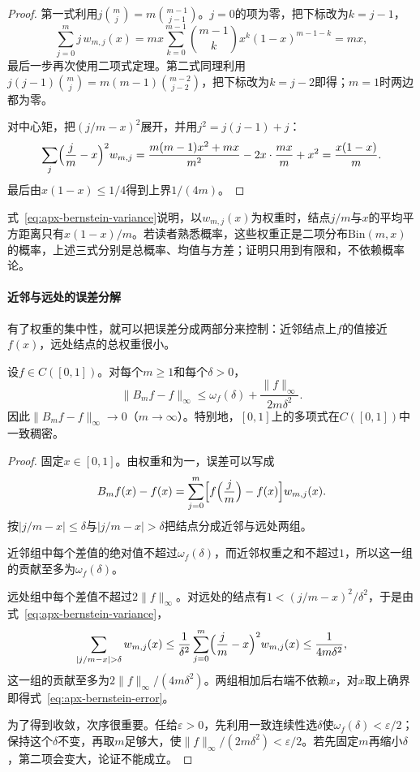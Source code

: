 \begin{proof}
第一式利用$j\binom mj=m\binom{m-1}{j-1}$。$j=0$的项为零，把下标改为$k=j-1$，
\[
  \sum_{j=0}^m j\,w_{m,j}(x)
  =mx\sum_{k=0}^{m-1}\binom{m-1}{k}x^k(1-x)^{m-1-k}=mx,
\]
最后一步再次使用二项式定理。第二式同理利用$j(j-1)\binom mj=m(m-1)\binom{m-2}{j-2}$，把下标改为$k=j-2$即得；$m=1$时两边都为零。

对中心矩，把$(j/m-x)^2$展开，并用$j^2=j(j-1)+j$：
\[
  \sum_{j}\Bigl(\frac jm-x\Bigr)^2w_{m,j}
  =\frac{m(m-1)x^2+mx}{m^2}-2x\cdot\frac{mx}{m}+x^2
  =\frac{x(1-x)}m .
\]
最后由$x(1-x)\le1/4$得到上界$1/(4m)$。
\end{proof}

式~\eqref{eq:apx-bernstein-variance}说明，以$w_{m,j}(x)$为权重时，结点$j/m$与$x$的平均平方距离只有$x(1-x)/m$。若读者熟悉概率，这些权重正是二项分布$\mathrm{Bin}(m,x)$的概率，上述三式分别是总概率、均值与方差；证明只用到有限和，不依赖概率论。

\paragraph{近邻与远处的误差分解}

有了权重的集中性，就可以把误差分成两部分来控制：近邻结点上$f$的值接近$f(x)$，远处结点的总权重很小。

\begin{theorem}
\label{thm:apx-bernstein}
设$f\in C([0,1])$。对每个$m\ge1$和每个$\delta>0$，
\begin{equation}
  \|B_mf-f\|_\infty\le\omega_f(\delta)+\frac{\|f\|_\infty}{2m\delta^2}.
  \label{eq:apx-bernstein-error}
\end{equation}
因此$\|B_mf-f\|_\infty\to0$（$m\to\infty$）。特别地，$[0,1]$上的多项式在$C([0,1])$中一致稠密。
\end{theorem}

\begin{proof}
固定$x\in[0,1]$。由权重和为一，误差可以写成
\[
  B_mf(x)-f(x)=\sum_{j=0}^m\Bigl[f\Bigl(\frac jm\Bigr)-f(x)\Bigr]w_{m,j}(x).
\]
按$|j/m-x|\le\delta$与$|j/m-x|>\delta$把结点分成近邻与远处两组。

近邻组中每个差值的绝对值不超过$\omega_f(\delta)$，而近邻权重之和不超过$1$，所以这一组的贡献至多为$\omega_f(\delta)$。

远处组中每个差值不超过$2\|f\|_\infty$。对远处的结点有$1<(j/m-x)^2/\delta^2$，于是由式~\eqref{eq:apx-bernstein-variance}，
\[
  \sum_{|j/m-x|>\delta}w_{m,j}(x)
  \le\frac1{\delta^2}\sum_{j=0}^m\Bigl(\frac jm-x\Bigr)^2w_{m,j}(x)
  \le\frac1{4m\delta^2},
\]
这一组的贡献至多为$2\|f\|_\infty/(4m\delta^2)$。两组相加后右端不依赖$x$，对$x$取上确界即得式~\eqref{eq:apx-bernstein-error}。

为了得到收敛，次序很重要。任给$\varepsilon>0$，先利用一致连续性选$\delta$使$\omega_f(\delta)<\varepsilon/2$；保持这个$\delta$不变，再取$m$足够大，使$\|f\|_\infty/(2m\delta^2)<\varepsilon/2$。若先固定$m$再缩小$\delta$，第二项会变大，论证不能成立。
\end{proof}

